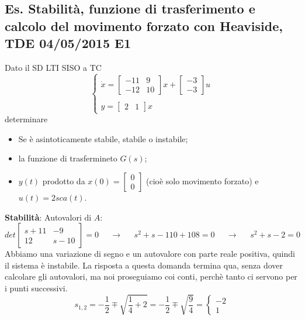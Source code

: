 \subsection{Es. Stabilità, funzione di trasferimento e calcolo del movimento forzato con Heaviside, TDE 04/05/2015 E1}
Dato il SD LTI SISO a TC 
\[
    \begin{cases}
        \dot{x} = \left[\begin{matrix}
            -11 & 9 \\ -12 & 10 
        \end{matrix}\right]x + \left[\begin{matrix}
            -3\\-3
        \end{matrix}\right] u \\
        \\
        y = \left[\begin{matrix}
            2 &1
        \end{matrix}\right] x
    \end{cases}
\]
determinare
\begin{itemize}
    \item Se è asintoticamente stabile, stabile o instabile;
    \item la funzione di trasfermineto $G(s)$;
    \item $y(t)$ prodotto da $x(0) = \left[\begin{matrix}
        0\\0
    \end{matrix}\right]$ (cioè solo movimento forzato) e $u(t) = 2 sca(t)$. 
\end{itemize}
\textbf{Stabilità}:\newline
Autovalori di $A$:
\[
    det \left[\begin{matrix}
        s +11 & -9 \\ 12 & s-10
    \end{matrix}\right] = 0 \;\;\;\;\;\rightarrow \;\;\;\;\; s^2 + s -110 +108 = 0 \;\;\;\;\; \rightarrow  \;\;\;\;\; s^2 + s -2 = 0
\]
Abbiamo una variazione di segno e un autovalore con parte reale positiva, quindi il sistema è instabile.\newline
La risposta a questa domanda termina qua, senza dover calcolare gli autovalori, ma noi proseguiamo coi conti, perchè tanto ci servono per i punti successivi.\newline
\[
    s_{1,2} = - \frac{1}{2} \mp \sqrt{\frac{1}{4} + 2} = - \frac{1}{2} \mp \sqrt{\frac{9}{4}} = \begin{cases}
        -2\\ 1
    \end{cases}
\]
